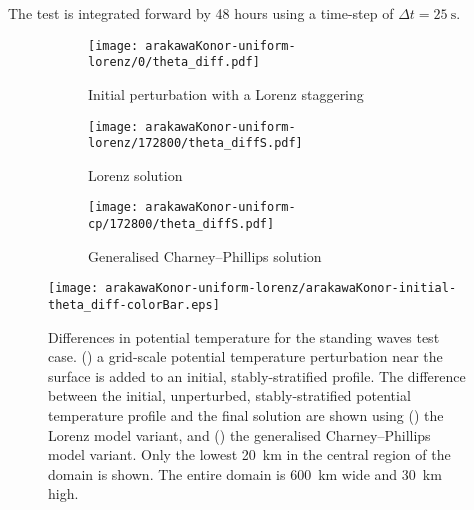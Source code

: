 The test is integrated forward by 48 hours using a time-step of $\Delta t = \SI{25}{\second}$.

\begin{figure}
	\centering
	\begin{subfigure}{0.38\textwidth}
		\vspace*{1.1em}
		\texttt{[image: arakawaKonor-uniform-lorenz/0/theta\_diff.pdf]}
		\caption{Initial perturbation with a Lorenz staggering}
		\label{fig:cp:arakawaKonor:theta_diff:initial}
	\end{subfigure}
	\begin{subfigure}{0.3\textwidth}
		\texttt{[image: arakawaKonor-uniform-lorenz/172800/theta\_diffS.pdf]}
		\caption{Lorenz solution}
		\label{fig:cp:arakawaKonor:theta_diff:lorenz}
	\end{subfigure}
	\begin{subfigure}{0.3\textwidth}
		\vspace*{1.1em}
		\texttt{[image: arakawaKonor-uniform-cp/172800/theta\_diffS.pdf]}
		\caption{Generalised Charney--Phillips solution}
		\label{fig:cp:arakawaKonor:theta_diff:cp}
	\end{subfigure}
%
\vspace{0.5em}
\texttt{[image: arakawaKonor-uniform-lorenz/arakawaKonor-initial-theta\_diff-colorBar.eps]}
%
	\caption{Differences in potential temperature for the standing waves test case.
	() a grid-scale potential temperature perturbation near the surface is added to an initial, stably-stratified profile.
The difference between the initial, unperturbed, stably-stratified potential temperature profile and the final solution are shown using
	() the Lorenz model variant, and 
	() the generalised Charney--Phillips model variant.
Only the lowest \SI{20}{\kilo\meter} in the central region of the domain is shown.  The entire domain is \SI{600}{\kilo\meter} wide and \SI{30}{\kilo\meter} high.
	}
	\label{fig:cp:arakawaKonor:theta_diff}
\end{figure}


